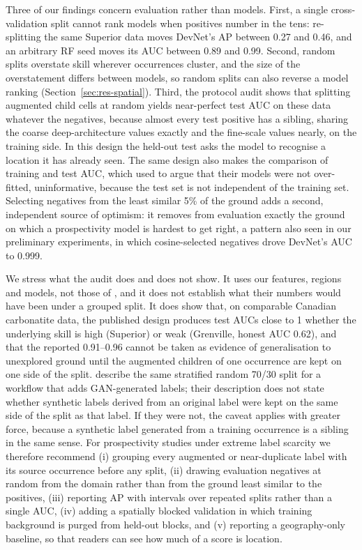 \documentclass[pdflatex,sn-apa]{sn-jnl}
\begin{document}
Three of our findings concern evaluation rather than models. First, a single cross-validation split cannot rank models when positives number in the tens: re-splitting the same Superior data moves DevNet's AP between 0.27 and 0.46, and an arbitrary RF seed moves its AUC between 0.89 and 0.99. Second, random splits overstate skill wherever occurrences cluster, and the size of the overstatement differs between models, so random splits can also reverse a model ranking (Section~\ref{sec:res-spatial}). Third, the protocol audit shows that splitting augmented child cells at random yields near-perfect test AUC on these data whatever the negatives, because almost every test positive has a sibling, sharing the coarse deep-architecture values exactly and the fine-scale values nearly, on the training side. In this design the held-out test asks the model to recognise a location it has already seen. The same design also makes the comparison of training and test AUC, which \citet{Parsa2024} used to argue that their models were not over-fitted, uninformative, because the test set is not independent of the training set. Selecting negatives from the least similar 5\% of the ground adds a second, independent source of optimism: it removes from evaluation exactly the ground on which a prospectivity model is hardest to get right, a pattern also seen in our preliminary experiments, in which cosine-selected negatives drove DevNet's AUC to 0.999.

We stress what the audit does and does not show. It uses our features, regions and models, not those of \citet{Parsa2024}, and it does not establish what their numbers would have been under a grouped split. It does show that, on comparable Canadian carbonatite data, the published design produces test AUCs close to 1 whether the underlying skill is high (Superior) or weak (Grenville, honest AUC 0.62), and that the reported 0.91--0.96 cannot be taken as evidence of generalisation to unexplored ground until the augmented children of one occurrence are kept on one side of the split. \citet{Parsa2025} describe the same stratified random 70/30 split for a workflow that adds GAN-generated labels; their description does not state whether synthetic labels derived from an original label were kept on the same side of the split as that label. If they were not, the caveat applies with greater force, because a synthetic label generated from a training occurrence is a sibling in the same sense. For prospectivity studies under extreme label scarcity we therefore recommend (i) grouping every augmented or near-duplicate label with its source occurrence before any split, (ii) drawing evaluation negatives at random from the domain rather than from the ground least similar to the positives, (iii) reporting AP with intervals over repeated splits rather than a single AUC, (iv) adding a spatially blocked validation in which training background is purged from held-out blocks, and (v) reporting a geography-only baseline, so that readers can see how much of a score is location.
\end{document}
